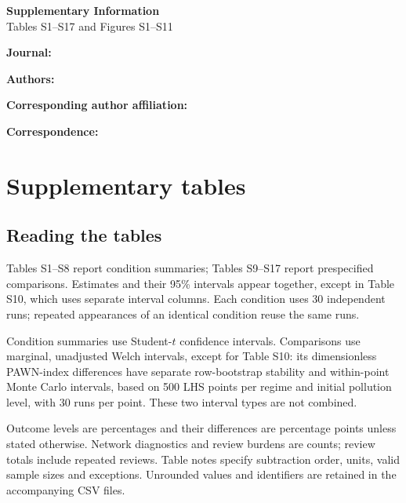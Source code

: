 \documentclass[10pt]{article}
\begin{document}
\begin{center}
{\LARGE\bfseries Supplementary Information}\\[5pt]
{\large Tables S1--S17 and Figures S1--S11}
\end{center}
\ifx\ABMArticleTitle\ABMEmpty\else
\begin{center}
  \begin{minipage}{0.90\textwidth}
    \centering
    \fontsize{13}{17}\selectfont
    \bfseries
    \ABMArticleTitle\par
  \end{minipage}
\end{center}
\vspace{3pt}
\fi
\ifx\ABMJournal\ABMEmpty\else\textbf{Journal:} \ABMJournal\par\fi
\ifx\ABMAuthors\ABMEmpty\else\textbf{Authors:} \ABMAuthors\par\fi
\ifx\ABMCorrespondingAffiliation\ABMEmpty\else\textbf{Corresponding author affiliation:} \ABMCorrespondingAffiliation\par\fi
\ifx\ABMCorrespondingEmail\ABMEmpty\else\textbf{Correspondence:} \ABMCorrespondingEmail\par\fi
\begingroup
\small
\setlength{\parskip}{0pt}
\tableofcontents
\endgroup
\clearpage

\section{Supplementary tables}\label{sec:supp-tables}
\subsection*{Reading the tables}

Tables S1--S8 report condition summaries; Tables S9--S17 report prespecified comparisons. Estimates and their 95\% intervals appear together, except in Table S10, which uses separate interval columns. Each condition uses 30 independent runs; repeated appearances of an identical condition reuse the same runs.

Condition summaries use Student-$t$ confidence intervals. Comparisons use marginal, unadjusted Welch intervals, except for Table S10: its dimensionless PAWN-index differences have separate row-bootstrap stability and within-point Monte Carlo intervals, based on 500 LHS points per regime and initial pollution level, with 30 runs per point. These two interval types are not combined.

Outcome levels are percentages and their differences are percentage points unless stated otherwise. Network diagnostics and review burdens are counts; review totals include repeated reviews. Table notes specify subtraction order, units, valid sample sizes and exceptions. Unrounded values and identifiers are retained in the accompanying CSV files.
\end{document}
